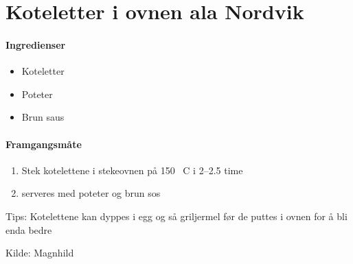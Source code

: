 \section{﻿Koteletter i ovnen ala Nordvik}


\paragraph{Ingredienser}
\begin{itemize}[noitemsep]
	\item Koteletter
	\item Poteter
	\item Brun saus
\end{itemize}

\paragraph{Framgangsmåte}
\begin{enumerate}[noitemsep]
	\item Stek kotelettene i stekeovnen på 150 \degree~C i 2--2.5 time
	\item serveres med poteter og brun sos
\end{enumerate}

Tips: Kotelettene kan dyppes i egg og så griljermel før de puttes i ovnen for å bli enda bedre

Kilde: Magnhild
